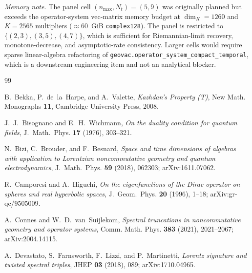 \documentclass[11pt,a4paper]{article}
\theoremstyle{plain}
\theoremstyle{definition}
\newcommand{\nmax}{n_{\max}}
\newcommand{\Nt}{N_{t}}
\begin{document}
\medskip\noindent\textit{Memory note.} The panel cell $(\nmax, \Nt) =
(5, 9)$ was originally planned but exceeds the operator-system
vec-matrix memory budget at $\dim_{K} = 1260$ and $K = 2565$ multipliers
($\approx 60$~GiB \texttt{complex128}). The panel is restricted to
$\{(2,3), (3,5), (4,7)\}$, which is sufficient for Riemannian-limit
recovery, monotone-decrease, and asymptotic-rate consistency. Larger
cells would require sparse linear-algebra refactoring of
\texttt{geovac.operator\_system\_compact\_temporal}, which is a
downstream engineering item and not an analytical blocker.

\begin{thebibliography}{99}

B.~Bekka, P.~de~la~Harpe, and A.~Valette,
\newblock \emph{Kazhdan's Property (T)},
\newblock New Math. Monographs \textbf{11}, Cambridge University Press, 2008.

J.~J.~Bisognano and E.~H.~Wichmann,
\newblock \emph{On the duality condition for quantum fields},
\newblock J.~Math.~Phys. \textbf{17} (1976), 303--321.

N.~Bizi, C.~Brouder, and F.~Besnard,
\newblock \emph{Space and time dimensions of algebras with application
to Lorentzian noncommutative geometry and quantum electrodynamics},
\newblock J.~Math.~Phys. \textbf{59} (2018), 062303;
\newblock arXiv:1611.07062.

R.~Camporesi and A.~Higuchi,
\newblock \emph{On the eigenfunctions of the Dirac operator on spheres
and real hyperbolic spaces},
\newblock J.~Geom.~Phys. \textbf{20} (1996), 1--18;
\newblock arXiv:gr-qc/9505009.

A.~Connes and W.~D.~van~Suijlekom,
\newblock \emph{Spectral truncations in noncommutative geometry and
operator systems},
\newblock Comm. Math. Phys. \textbf{383} (2021), 2021--2067;
\newblock arXiv:2004.14115.

A.~Devastato, S.~Farnsworth, F.~Lizzi, and P.~Martinetti,
\newblock \emph{Lorentz signature and twisted spectral triples},
\newblock JHEP \textbf{03} (2018), 089; arXiv:1710.04965.


\end{thebibliography}
\end{document}
